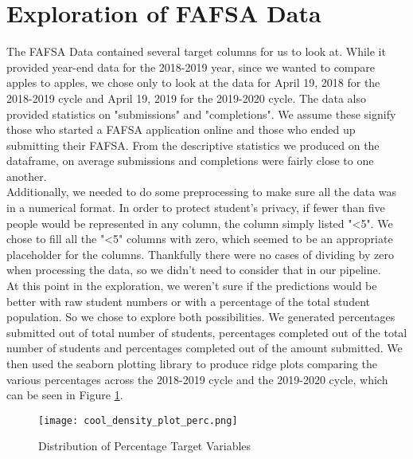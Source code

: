 \documentclass[12pt]{article}
\begin{document}
\section{Exploration of FAFSA Data}

The FAFSA Data contained several target columns for us to look at. While it 
provided year-end data for the 2018-2019 year, since we wanted to compare
apples to apples, we chose only to look at the data for April 19, 2018 for the
2018-2019 cycle and April 19, 2019 for the 2019-2020 cycle. The data also provided
statistics on "submissions" and "completions". We assume these signify those who
started a FAFSA application online and those who ended up submitting their FAFSA.
From the descriptive statistics we produced on the dataframe, on average 
submissions and completions were fairly close to one another.\\

Additionally, we needed to do some preprocessing to make sure all the data was
in a numerical format. In order to protect student's privacy, if fewer than five
people would be represented in any column, the column simply listed "<5". We chose
to fill all the "<5" columns with zero, which seemed to be an appropriate placeholder
for the columns. Thankfully there were no cases of dividing by zero when processing
the data, so we didn't need to consider that in our pipeline.\\

At this point in the exploration, we weren't sure if the predictions would be better
with raw student numbers or with a percentage of the total student population.
So we chose to explore both possibilities. We generated percentages submitted out of
total number of students, percentages completed out of the total number of students
and percentages completed out of the amount submitted. We then used the seaborn
plotting library to produce ridge plots comparing the various percentages across the 
2018-2019 cycle and the 2019-2020 cycle, which can be seen in Figure 
\ref{fig:target_perc}. \cite{snsridgeplot2019} \\

\begin{figure}[!htb]
  \centering
  \texttt{[image: cool\_density\_plot\_perc.png]}
  \caption{Distribution of Percentage Target Variables}
  \label{fig:target_perc}
\end{figure}
\end{document}
